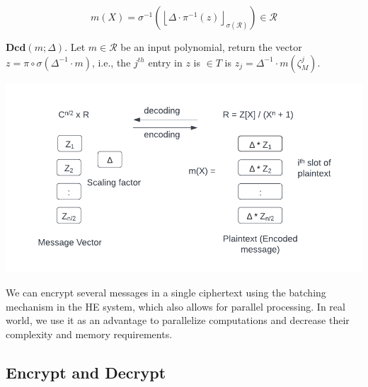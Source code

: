 \documentclass{article}
\begin{document}
\begin{equation*}
m(X)=\sigma^{-1}\left(\left\lfloor\Delta \cdot \pi^{-1}(z)\right\rfloor_{\sigma(\mathcal{R})}\right) \in \mathcal{R}
\end{equation*}


\noindent $\textbf{Dcd}(m ; \Delta)$. Let $m \in \mathcal{R}$ be an input polynomial, return the vector $z=\pi \circ \sigma\left(\Delta^{-1} \cdot m\right)$, i.e., the $j^{th}$ entry in $z$ is $\in T$ is $z_j=\Delta^{-1} \cdot m\left(\zeta_M^j\right)$.
\\


\begin{center}
    \includegraphics[scale = 0.8]{Crypto_Img_4.png}
\end{center}

\noindent We can encrypt several messages in a single ciphertext using the batching mechanism in the HE system, which also allows for parallel processing. In real world, we use it as an advantage to parallelize computations and decrease their complexity and memory requirements.




\subsection{Encrypt and Decrypt}

\end{document}
